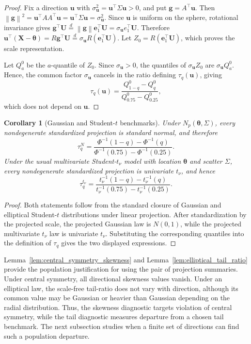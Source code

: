 \documentclass[11pt]{article}
\theoremstyle{plain}
\newtheorem{corollary}{Corollary}
\theoremstyle{definition}
\theoremstyle{remark}
\def\X{\bm{X}}
\def\u{\bm{u}}
\newcommand{\boldtheta}{\bm{\theta}}
\newcommand{\norm}[1]{\left\| #1 \right\|}
\begin{document}
\begin{proof}
	Fix a direction $\u$ with \(\sigma_{\u}^2=\u^\top\Sigma \u>0\), and put \(\bm{g}=A^\top \u\). Then \(\norm{\bm{g}}^2=\u^\top AA^\top \u=\u^\top\Sigma \u=\sigma_{\u}^2\). Since $\u$ is uniform on the sphere, rotational invariance gives \(\bm{g}^\top \bm{U}\stackrel{d}{=}\norm{\bm{g}} \bm{e}_1^\top \bm{U}=\sigma_{\u} e_1^\top \bm{U}\). Therefore
	\(\u^\top(\X-\boldtheta)=R \bm{g}^\top \bm{U}\stackrel{d}{=}\sigma_{\u} R(\bm{e}_1^\top \bm{U}).\) Let \(Z_0=R(\bm{e}_1^\top \bm{U})\), which proves the scale representation.
	
	Let \(Q_a^0\) be the \(a\)-quantile of \(Z_0\). Since \(\sigma_{\u}>0\), the quantiles of \(\sigma_{\u} Z_0\) are \(\sigma_{\u} Q_a^0\). Hence, the common factor \(\sigma_{\u}\) cancels in the ratio defining \(\tau_q(\u)\), giving
	\[
	\tau_q(\u) = \frac{Q_{1-q}^0-Q_q^0}{Q_{0.75}^0-Q_{0.25}^0},
	\]
	which does not depend on $\u$.
\end{proof}

\begin{corollary}[Gaussian and Student-\(t\) benchmarks]
	\label{cor:gaussian_t_benchmarks}
	Under \(N_p(\boldtheta,\Sigma)\), every nondegenerate standardized projection is standard normal, and therefore
	\[
	\tau_q^N = \frac{\Phi^{-1}(1-q)-\Phi^{-1}(q)} {\Phi^{-1}(0.75)-\Phi^{-1}(0.25)}.
	\]
	Under the usual multivariate Student-\(t_\nu\) model with location $\boldtheta$ and scatter \(\Sigma\), every nondegenerate standardized projection is univariate \(t_\nu\), and hence
	\[
	\tau_q^{t_\nu} = \frac{t_\nu^{-1}(1-q)-t_\nu^{-1}(q)}{t_\nu^{-1}(0.75)-t_\nu^{-1}(0.25)}.
	\]
\end{corollary}

\begin{proof}
	Both statements follow from the standard closure of Gaussian and elliptical Student-\(t\) distributions under linear projection. After standardization by the projected scale, the projected Gaussian law is \(N(0,1)\), while the projected multivariate \(t_\nu\) law is univariate \(t_\nu\). Substituting the corresponding quantiles into the definition of \(\tau_q\) gives the two displayed expressions.
\end{proof}

Lemma~\ref{lem:central_symmetry_skewness} and Lemma~\ref{lem:elliptical_tail_ratio} provide the population justification for using the pair of projection summaries. Under central symmetry, all directional skewness values vanish. Under an elliptical law, the scale-free tail-ratio does not vary with direction, although its common value may be Gaussian or heavier than Gaussian depending on the radial distribution. Thus, the skewness diagnostic targets violation of central symmetry, while the tail diagnostic measures departure from a chosen tail benchmark. The next subsection studies when a finite set of directions can find such a population departure.
\end{document}
